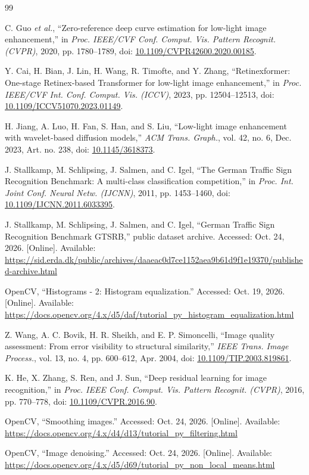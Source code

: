 \begin{thebibliography}{99}
\raggedright
\setlength{\itemsep}{6pt}
C. Guo \textit{et al.}, ``Zero-reference deep curve estimation for low-light image enhancement,'' in \textit{Proc. IEEE/CVF Conf. Comput. Vis. Pattern Recognit. (CVPR)}, 2020, pp. 1780--1789, doi: \href{https://doi.org/10.1109/CVPR42600.2020.00185}{10.1109/CVPR42600.2020.00185}.

Y. Cai, H. Bian, J. Lin, H. Wang, R. Timofte, and Y. Zhang, ``Retinexformer: One-stage Retinex-based Transformer for low-light image enhancement,'' in \textit{Proc. IEEE/CVF Int. Conf. Comput. Vis. (ICCV)}, 2023, pp. 12504--12513, doi: \href{https://doi.org/10.1109/ICCV51070.2023.01149}{10.1109/ICCV51070.2023.01149}.

H. Jiang, A. Luo, H. Fan, S. Han, and S. Liu, ``Low-light image enhancement with wavelet-based diffusion models,'' \textit{ACM Trans. Graph.}, vol. 42, no. 6, Dec. 2023, Art. no. 238, doi: \href{https://doi.org/10.1145/3618373}{10.1145/3618373}.

J. Stallkamp, M. Schlipsing, J. Salmen, and C. Igel, ``The German Traffic Sign Recognition Benchmark: A multi-class classification competition,'' in \textit{Proc. Int. Joint Conf. Neural Netw. (IJCNN)}, 2011, pp. 1453--1460, doi: \href{https://doi.org/10.1109/IJCNN.2011.6033395}{10.1109/IJCNN.2011.6033395}.

J. Stallkamp, M. Schlipsing, J. Salmen, and C. Igel, ``German Traffic Sign Recognition Benchmark GTSRB,'' public dataset archive. Accessed: Oct. 24, 2026. [Online]. Available: \url{https://sid.erda.dk/public/archives/daaeac0d7ce1152aea9b61d9f1e19370/published-archive.html}

OpenCV, ``Histograms - 2: Histogram equalization.'' Accessed: Oct. 19, 2026. [Online]. Available: \url{https://docs.opencv.org/4.x/d5/daf/tutorial_py_histogram_equalization.html}

Z. Wang, A. C. Bovik, H. R. Sheikh, and E. P. Simoncelli, ``Image quality assessment: From error visibility to structural similarity,'' \textit{IEEE Trans. Image Process.}, vol. 13, no. 4, pp. 600--612, Apr. 2004, doi: \href{https://doi.org/10.1109/TIP.2003.819861}{10.1109/TIP.2003.819861}.

K. He, X. Zhang, S. Ren, and J. Sun, ``Deep residual learning for image recognition,'' in \textit{Proc. IEEE Conf. Comput. Vis. Pattern Recognit. (CVPR)}, 2016, pp. 770--778, doi: \href{https://doi.org/10.1109/CVPR.2016.90}{10.1109/CVPR.2016.90}.

OpenCV, ``Smoothing images.'' Accessed: Oct. 24, 2026. [Online]. Available: \url{https://docs.opencv.org/4.x/d4/d13/tutorial_py_filtering.html}

OpenCV, ``Image denoising.'' Accessed: Oct. 24, 2026. [Online]. Available: \url{https://docs.opencv.org/4.x/d5/d69/tutorial_py_non_local_means.html}

\end{thebibliography}
